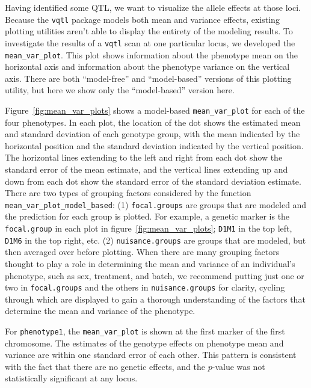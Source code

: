 \documentclass[9pt,twocolumn,twoside]{gsag3jnl}
\begin{document}
Having identified some QTL, we want to visualize the allele effects at those loci.
Because the \texttt{vqtl} package models both mean and variance effects, existing plotting utilities aren't able to display the entirety of the modeling results.
To investigate the results of a \texttt{vqtl} scan at one particular locus, we developed the \texttt{mean\_var\_plot}.
This plot shows information about the phenotype mean on the horizontal axis and information about the phenotype variance on the vertical axis.
There are both ``model-free'' and ``model-based'' versions of this plotting utility, but here we show only the ``model-based'' version here.

Figure~\ref{fig:mean_var_plots} shows a model-based \texttt{mean\_var\_plot} for each of the four phenotypes.
In each plot, the location of the dot shows the estimated mean and standard deviation of each genotype group, with the mean indicated by the horizontal position and the standard deviation indicated by the vertical position.
The horizontal lines extending to the left and right from each dot show the standard error of the mean estimate, and the vertical lines extending up and down from each dot show the standard error of the standard deviation estimate.
There are two types of grouping factors considered by the function \texttt{mean\_var\_plot\_model\_based}:
(1) \texttt{focal.groups} are groups that are modeled and the prediction for each group is plotted.
For example, a genetic marker is the \texttt{focal.group} in each plot in figure~\ref{fig:mean_var_plots}; \texttt{D1M1} in the top left, \texttt{D1M6} in the top right, etc.
(2) \texttt{nuisance.groups} are groups that are modeled, but then averaged over before plotting.
When there are many grouping factors thought to play a role in determining the mean and variance of an individual's phenotype, such as sex, treatment, and batch, we recommend putting just one or two in \texttt{focal.groups} and the others in \texttt{nuisance.groups} for clarity, cycling through which are displayed to gain a thorough understanding of the factors that determine the mean and variance of the phenotype.

For \texttt{phenotype1}, the \texttt{mean\_var\_plot} is shown at the first marker of the first chromosome.
The estimates of the genotype effects on phenotype mean and variance are within one standard error of each other.
This pattern is consistent with the fact that there are no genetic effects, and the $p$-value was not statistically significant at any locus.
\end{document}
